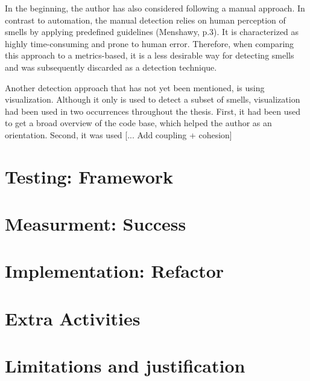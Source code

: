 In the beginning, the author has also considered following a manual approach. In contrast to automation, the manual detection relies on human perception of smells by applying predefined guidelines (Menshawy, p.3). It is characterized as highly time-consuming and prone to human error. Therefore, when comparing this approach to a metrics-based, it is a less desirable way for detecting smells and was subsequently discarded as a detection technique.

Another detection approach that has not yet been mentioned, is using visualization. Although it only is used to detect a subset of smells, visualization had been used in two occurrences throughout the thesis. First, it had been used to get a broad overview of the code base, which helped the author as an orientation. Second, it was used [... Add coupling + cohesion]





\section{Testing: Framework}

\section{Measurment: Success}

\section{Implementation: Refactor}

\section{Extra Activities}

\section{Limitations and justification}

